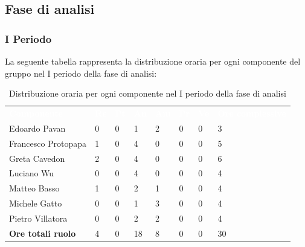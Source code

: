 \subsection{Fase di analisi}
\subsubsection{I Periodo}
La seguente tabella rappresenta la distribuzione oraria per ogni componente del gruppo nel I periodo della fase di analisi:
\begin{table}[!htbp]
\begin{center}
\renewcommand{\arraystretch}{1.25}
\begin{tabular}{ m{}<{\centering}  m{}<{\centering} m{}<{\centering} m{}<{\centering}  m{}<{\centering}  m{}<{\centering}  m{}<{\centering}  m{}<{\centering}   }
	\rowcolor{darkblue}
	\textcolor{white}{\textbf{Componente}} &\textcolor{white}{\textbf{Re}}&\textcolor{white}{\textbf{Pt}}&\textcolor{white}{\textbf{An}}&\textcolor{white}{\textbf{Am}}&\textcolor{white}{\textbf{Pr}}&\textcolor{white}{\textbf{Ve}}&\textcolor{white}{\textbf{Ore complessive}}\\ 

	Edoardo Pavan & 0 & 0 & 1 & 2 & 0 & 0 & 3 \\	
	
	Francesco Protopapa & 1 & 0 & 4 & 0 & 0 & 0 & 5 \\

	Greta Cavedon & 2 & 0 & 4 & 0 & 0 & 0 & 6 \\
	
	Luciano Wu & 0 & 0 & 4 & 0 & 0 & 0 & 4\\
	
	Matteo Basso & 1 & 0 & 2 & 1 & 0 & 0 & 4 \\
	
	Michele Gatto &  0 & 0 & 1 & 3 & 0 & 0 & 4\\
	
	Pietro Villatora & 0 & 0 & 2 & 2 & 0 & 0 & 4 \\
	
	\textbf{Ore totali ruolo} & 4 & 0 & 18 & 8 & 0 & 0 & 30\\

\end{tabular}
\caption{Distribuzione oraria per ogni componente nel I periodo della fase di analisi}
\end{center}
\end{table}

